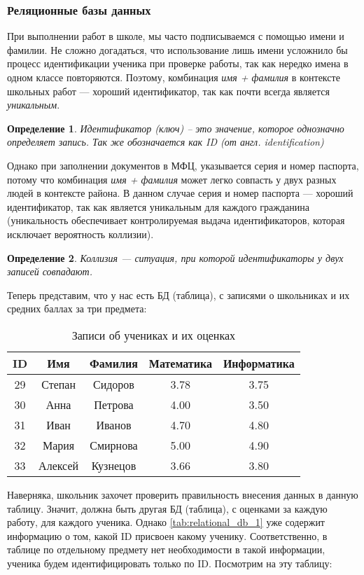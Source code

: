 \documentclass[12pt]{article}
\newtheorem{definition}{Определение}[section]
\theoremstyle{problem_style}
\begin{document}
\subsubsection{Реляционные базы данных}
При выполнении работ в школе, мы часто подписываемся с помощью имени и фамилии. Не сложно догадаться, что использование лишь имени усложнило бы процесс идентификации ученика при проверке работы, так как нередко имена в одном классе повторяются. Поэтому, комбинация \textit{имя + фамилия} в контексте школьных работ — хороший идентификатор, так как почти всегда является \textit{уникальным}.
\begin{definition}
Идентификатор (ключ) – это значение, которое однозначно определяет запись. Так же обозначается как \textit{ID} (от англ. identification)
\end{definition}
Однако при заполнении документов в МФЦ, указывается серия и номер паспорта, потому что комбинация \textit{имя + фамилия} может легко совпасть у двух разных людей в контексте района. В данном случае серия и номер паспорта — хороший идентификатор, так как является уникальным для каждого гражданина (уникальность обеспечивает контролируемая выдача идентификаторов, которая исключает вероятность коллизии).
\begin{definition}
Коллизия — ситуация, при которой идентификаторы у двух записей совпадают.
\end{definition}
Теперь представим, что у нас есть БД (таблица), с записями о школьниках и их средних баллах за три предмета:
\begin{table}[H]
    \centering
    \begin{tabular}{|c|c|c|c|c|} \hline
        ID & Имя & Фамилия & Математика & Информатика \\ \hline
        29 & Степан & Сидоров & 3.78 & 3.75 \\ \hline
        30 & Анна & Петрова & 4.00 & 3.50 \\ \hline
        31 & Иван & Иванов & 4.70 & 4.80 \\ \hline
        32 & Мария & Смирнова & 5.00 & 4.90 \\ \hline
        33 & Алексей & Кузнецов & 3.66 & 3.80 \\ \hline
    \end{tabular}
    \caption{Записи об учениках и их оценках}
    \label{tab:relational_db_1}
\end{table}
Наверняка, школьник захочет проверить правильность внесения данных в данную таблицу. Значит, должна быть другая БД (таблица), с оценками за каждую работу, для каждого ученика. Однако \autoref{tab:relational_db_1} уже содержит информацию о том, какой ID присвоен какому ученику. Соответственно, в таблице по отдельному предмету нет необходимости в такой информации, ученика будем идентифицировать только по ID. Посмотрим на эту таблицу:
\end{document}
